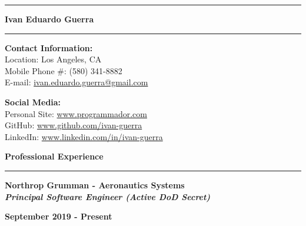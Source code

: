 \documentclass[11pt,letterpaper]{article}
\begin{document}

\hrule
\begin{center}
	\begin{LARGE}
		\textbf{Ivan Eduardo Guerra}
	\end{LARGE}
\end{center}
\hrule

\medskip

\begin{minipage}[t]{0.5\textwidth}
	\begin{flushleft}
		\textbf{Contact Information:}\\
		Location: Los Angeles, CA\\
		Mobile Phone \#: (580) 341-8882\\
		E-mail:
		\href{mailto:ivan.eduardo.guerra@gmail.com}{ivan.eduardo.guerra@gmail.com}
	\end{flushleft}
\end{minipage}
\begin{minipage}[t]{0.46\textwidth}
	\begin{flushright}
		\begin{flushleft}
			\textbf{Social Media:}\\
			Personal Site: \url{www.programmador.com}\\
			GitHub: \url{www.github.com/ivan-guerra}\\
			LinkedIn: \url{www.linkedin.com/in/ivan-guerra}
		\end{flushleft}
	\end{flushright}
\end{minipage}

\medskip

\begin{large}
	\textbf{Professional Experience}
\end{large}

\smallskip \hrule \medskip

\begin{minipage}[t]{0.53\textwidth}
	\begin{flushleft}
		\textbf{Northrop Grumman - Aeronautics Systems}\\
		\textbf{\textit{Principal Software Engineer (Active DoD Secret)}}\\
	\end{flushleft}
\end{minipage}
\begin{minipage}[t]{0.43\textwidth}
	\begin{flushright}
		\textbf{September 2019 - Present}
	\end{flushright}
\end{minipage}
\end{document}
